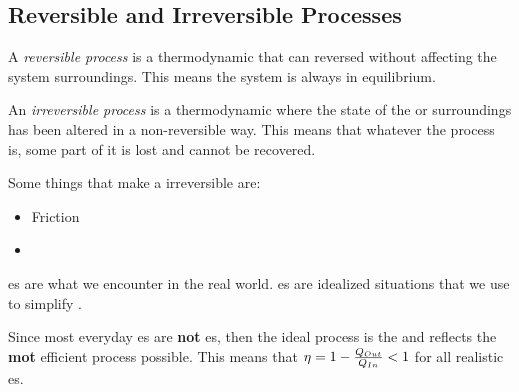 \subsection{Reversible and Irreversible Processes}\label{subsec:Reversible_Irreversible_Processes}
\begin{definition}\label{def:Reversible_Process}
  A \emph{reversible process} is a thermodynamic  that can reversed without affecting the system surroundings.
  This means the system is always in equilibrium.
\end{definition}

\begin{definition}\label{def:Irreversible_Process}
  An \emph{irreversible process} is a thermodynamic  where the state of the  or surroundings has been altered in a non-reversible way.
  This means that whatever the process is, some part of it is lost and cannot be recovered.
\end{definition}

Some things that make a  irreversible are:
\begin{itemize}[noitemsep]
\item Friction
\item {}
\end{itemize}

\begin{blackbox}
  es are what we encounter in the real world.
  es are idealized situations that we use to simplify .
\end{blackbox}

Since most everyday es are \textbf{not} es, then the ideal process is the  and reflects the \textbf{mot} efficient process possible.
This means that $\eta = 1 - \frac{Q_{Out}}{Q_{In}} < 1$ for all realistic es.

